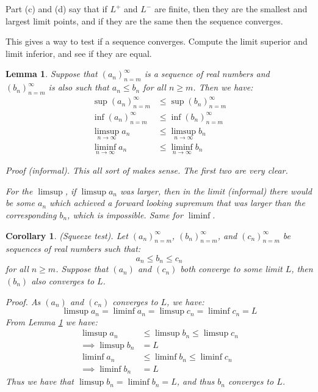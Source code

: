 \documentclass{article}
\newtheorem{lemma}{Lemma}[subsection]
\newtheorem{corollary}{Corollary}[subsection]
\let\it\textit
\begin{document}
Part (c) and (d) say that if $L^+$ and $L^-$ are finite, then
they are the smallest and largest limit points, and if 
they are the same then the sequence converges.

This gives a way to test if a sequence converges. Compute 
the limit superior and limit inferior, and see if they
are equal.

\begin{lemma}
\label{limit-superior-inequality}
	Suppose that $(a_n)_{n=m}^\infty$ is a sequence of real	
	numbers and \\ $(b_n)_{n=m}^\infty$ is also 
	such that $a_n \leq b_n$ for all $n \geq m$. 
	Then we have:
	\begin{align*}
		\sup (a_n)_{n=m}^\infty &\leq \sup (b_n)_{n=m}^\infty \\	
		\inf (a_n)_{n=m}^\infty &\leq \inf (b_n)_{n=m}^\infty \\ 
		\limsup_{n\to\infty} a_n &\leq \limsup_{n\to\infty} b_n \\ 
		\liminf_{n\to\infty} a_n &\leq \liminf_{n\to\infty} b_n
	\end{align*}

	\it{Proof} (informal). This all sort of makes sense. 
	The first two are very clear. 

	For the $\limsup$, if $\limsup a_n$ was larger, then 
	in the limit (informal) there would be some $a_n$ 
	which achieved a forward looking supremum that 
	was larger than the corresponding $b_n$, which is
	impossible. Same for $\liminf$.
\end{lemma}

\begin{corollary}
	(Squeeze test). Let $(a_n)_{n=m}^\infty$, $(b_n)_{n=m}^\infty$,
	and $(c_n)_{n=m}^\infty$ be sequences of real numbers such 
	that:
	$$
	a_n \leq b_n \leq c_n
	$$
	for all $n \geq m$. Suppose that $(a_n)$ and $(c_n)$ 
	both converge to some limit $L$, then $(b_n)$ also
	converges to $L$.

	\it{Proof}. As $(a_n)$ and $(c_n)$ converges to $L$, we have:
	$$
	\limsup a_n = \liminf a_n = \limsup c_n = \liminf c_n = L
	$$
	From Lemma \ref{limit-superior-inequality} we have:
	\begin{align*}
		\limsup a_n &\leq \limsup b_n \leq \limsup c_n \\	
		\implies \limsup b_n &= L \\
		\liminf a_n &\leq \liminf b_n \leq \liminf c_n \\ 
		\implies \liminf b_n &= L
	\end{align*}
	Thus we have that $\limsup b_n = \liminf b_n = L$, and 
	thus $b_n$ converges to $L$.
\end{corollary}
\end{document}
